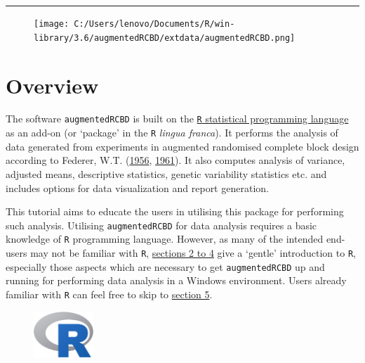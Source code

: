 \begin{center}
\vspace{6pt}
\hrule
\end{center}

\tableofcontents

\begin{figure}
  \vspace{-10pt}
  \begin{center}
    \texttt{[image: C:/Users/lenovo/Documents/R/win-library/3.6/augmentedRCBD/extdata/augmentedRCBD.png]}
  \end{center}
    \vspace{-10pt}
\end{figure}

\hypertarget{overview}{%
\section{Overview}\label{overview}}

The software \texttt{augmentedRCBD} is built on the
\href{https://en.wikipedia.org/wiki/R_(programming_language)}{\texttt{R}
statistical programming language} as an add-on (or `package' in the
\texttt{R} \emph{lingua franca}). It performs the analysis of data
generated from experiments in augmented randomised complete block design
according to Federer, W.T.
(\protect\hyperlink{ref-federer_augmented_1956}{1956},
\protect\hyperlink{ref-federer_augmented_1961}{1961}). It also computes
analysis of variance, adjusted means, descriptive statistics, genetic
variability statistics etc. and includes options for data visualization
and report generation.

This tutorial aims to educate the users in utilising this package for
performing such analysis. Utilising \texttt{augmentedRCBD} for data
analysis requires a basic knowledge of \texttt{R} programming language.
However, as many of the intended end-users may not be familiar with
\texttt{R}, \protect\hyperlink{rsoft}{sections 2 to 4} give a `gentle'
introduction to \texttt{R}, especially those aspects which are necessary
to get \texttt{augmentedRCBD} up and running for performing data
analysis in a Windows environment. Users already familiar with
\texttt{R} can feel free to skip to \protect\hyperlink{install}{section
5}.

\begin{figure}
  \vspace{-10pt}
  \begin{center}
    \includegraphics[width=0.20\textwidth]{rlogo.png}
  \end{center}
    \vspace{-10pt}
\end{figure}


